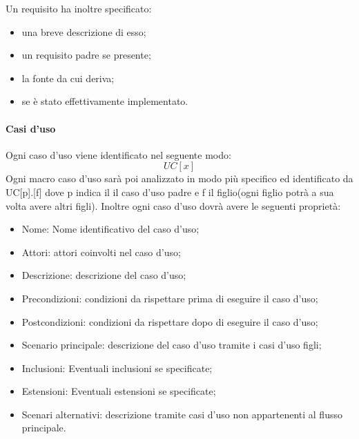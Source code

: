 		Un requisito ha inoltre specificato:
		\begin{itemize}
		\item una breve descrizione di esso;
		\item un requisito padre se presente;
		\item la fonte da cui deriva;
		\item se è stato effettivamente implementato.
		\end{itemize}
		\paragraph{Casi d'uso}
		Ogni caso d'uso viene identificato nel seguente modo:
		\begin{equation}
			UC[x]
		\end{equation}
		Ogni macro caso d'uso sarà poi analizzato in modo più specifico ed identificato da UC[p].[f] dove p indica il il caso d'uso padre e f il figlio(ogni figlio potrà a sua volta avere altri figli).
		Inoltre ogni caso d'uso dovrà avere le seguenti proprietà:
		\begin{itemize}
		\item Nome: Nome identificativo del caso d'uso;
		\item Attori: attori coinvolti nel caso d'uso;
		\item Descrizione: descrizione del caso d'uso;
		\item Precondizioni: condizioni da rispettare prima di eseguire il caso d'uso;%
		\item Postcondizioni: condizioni da rispettare dopo di eseguire il caso d'uso;%
		\item Scenario principale: descrizione del caso d'uso tramite i casi d'uso figli;
		\item Inclusioni: Eventuali inclusioni se specificate;
		\item Estensioni: Eventuali estensioni se specificate;
		\item Scenari alternativi: descrizione tramite casi d'uso non appartenenti al flusso principale.
		\end{itemize}
